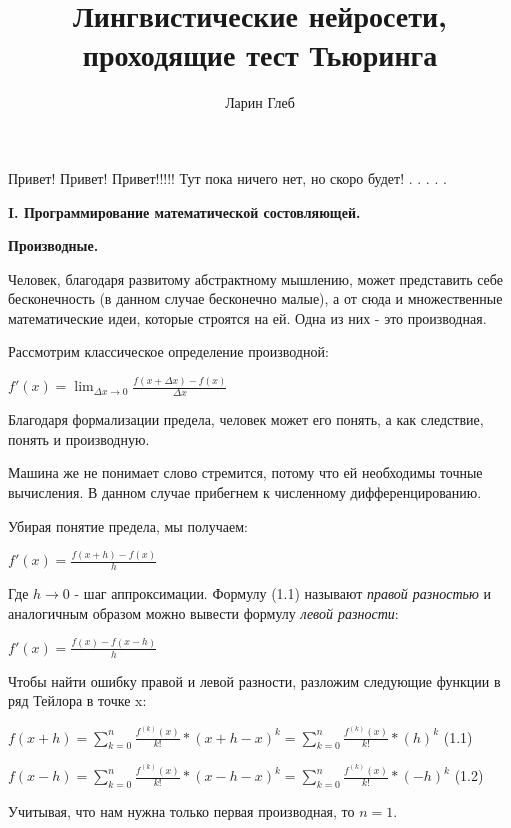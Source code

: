\documentclass[12pt]{extarticle}
\title{Лингвистические нейросети, проходящие тест Тьюринга}
\author{Ларин Глеб}
\begin{document}
\maketitle
	Привет! Привет! Привет!!!!! Тут пока ничего нет, но скоро будет!
	. \newline
	.\newline
	.\newline
	.\newline
	.\newline
	
	\centerline{\textbf{I. Программирование математической состовляющей.}}
	\centerline{\textbf{Производные.}}
	Человек, благодаря развитому абстрактному мышлению, может представить себе бесконечность (в данном случае бесконечно малые), а от сюда и множественные математические идеи, которые строятся на ей. Одна из них - это производная. \newline
	
	Рассмотрим классическое определение производной:
	
	\centerline{$f'(x) = \displaystyle\lim_{\Delta x\to0} \frac{f(x+\Delta x) - f(x)}{\Delta x} $} 
	
	Благодаря формализации предела, человек может его понять, а как следствие, понять и производную. \newline
	
	Машина же не понимает слово стремится, потому что ей необходимы точные вычисления. В данном случае прибегнем к численному дифференцированию. 
	
	Убирая понятие предела, мы получаем:
	
	\centerline{$f'(x) = \frac{f(x+h) - f(x)}{h} $} 
	
	Где $h \rightarrow 0$ - шаг аппроксимации. \newpage
	Формулу (1.1) называют \textit{правой разностью} и аналогичным образом можно вывести формулу \textit{левой разности}:
	
	\centerline{$f'(x) = \frac{f(x) - f(x-h)}{h}$} 
	
	Чтобы найти ошибку правой и левой разности, разложим следующие функции в ряд Тейлора в точке x:
	
	\centerline{$f(x+h) = \displaystyle \sum_{k=0}^{n} \frac{f^{(k)}(x)}{k!}*(x+h-x)^k=\displaystyle \sum_{k=0}^{n} \frac{f^{(k)}(x)}{k!}*(h)^k$ (1.1)} 
	\centerline{$f(x-h) = \displaystyle \sum_{k=0}^{n} \frac{f^{(k)}(x)}{k!}*(x-h-x)^k=\displaystyle \sum_{k=0}^{n} \frac{f^{(k)}(x)}{k!}*(-h)^k$ (1.2)}
	
	Учитывая, что нам нужна только первая производная, то $n=1$. 
	
\end{document}
